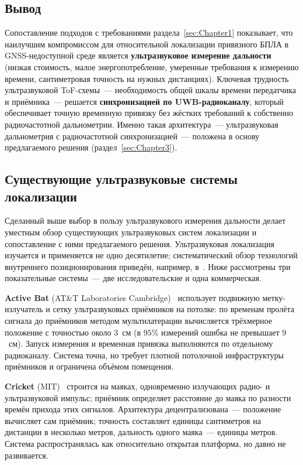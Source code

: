 \subsection{Вывод}

Сопоставление подходов с требованиями раздела~\ref{sec:Chapter1} показывает, что
наилучшим компромиссом для относительной локализации привязного БПЛА в
GNSS-недоступной среде является \textbf{ультразвуковое измерение дальности}
(низкая стоимость, малое энергопотребление, умеренные требования к измерению
времени, сантиметровая точность на нужных дистанциях). Ключевая трудность
ультразвуковой ToF-схемы~--- необходимость общей шкалы времени передатчика и
приёмника~--- решается \textbf{синхронизацией по UWB-радиоканалу}, который
обеспечивает точную временную привязку без жёстких требований к собственно
радиочастотной дальнометрии. Именно такая архитектура~--- ультразвуковая
дальнометрия с радиочастотной синхронизацией~--- положена в основу предлагаемого
решения (раздел~\ref{sec:Chapter3}).

\subsection{Существующие ультразвуковые системы локализации}
\label{sec:us-systems}

Сделанный выше выбор в пользу ультразвукового измерения дальности делает уместным обзор
существующих ультразвуковых систем локализации и сопоставление с ними предлагаемого решения.
Ультразвуковая локализация изучается и применяется не одно десятилетие; систематический
обзор технологий внутреннего позиционирования приведён, например, в~\cite{mautz2012}. Ниже
рассмотрены три показательные системы~--- две исследовательские и одна коммерческая.

\textbf{Active Bat} (AT\&T Laboratories Cambridge)~\cite{harter2002} использует подвижную
метку-излучатель и сетку ультразвуковых приёмников на потолке: по временам пролёта сигнала
до приёмников методом мультилатерации вычисляется трёхмерное положение с точностью около
$3$~см (в $95\%$ измерений ошибка не превышает $9$~см). Запуск измерения и временная
привязка выполняются по отдельному радиоканалу. Система точна, но требует плотной потолочной
инфраструктуры приёмников и ограничена объёмом помещения.

\textbf{Cricket} (MIT)~\cite{priyantha2000} строится на маяках, одновременно излучающих
радио- и ультразвуковой импульс; приёмник определяет расстояние до маяка по разности времён
прихода этих сигналов. Архитектура децентрализована~--- положение вычисляет сам приёмник;
точность составляет единицы сантиметров на дистанции в несколько метров, дальность одного
маяка~--- единицы метров. Система распространялась как относительно открытая платформа, но
давно не развивается.

